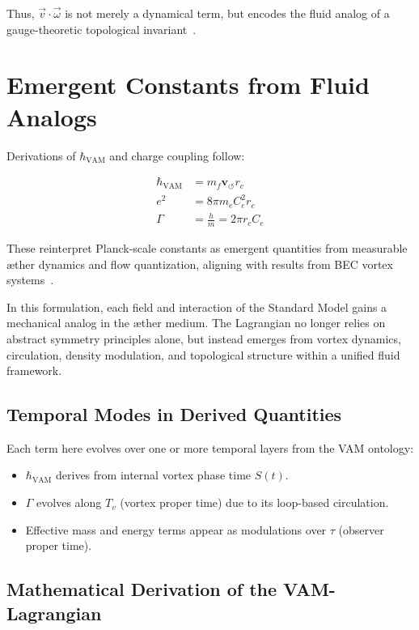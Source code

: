 \documentclass[12pt]{article}
\begin{document}
Thus, $\vec{v} \cdot \vec{\omega}$ is not merely a dynamical term, but encodes the fluid analog of a gauge-theoretic topological invariant~\cite{verlinde2021qft}.
\section{Emergent Constants from Fluid Analogs}
Derivations of $\hbar_{\text{VAM}}$ and charge coupling follow:

\begin{align}
    \hbar_{\text{VAM}} &= m_f \mathbf{v}_{\scriptscriptstyle\boldsymbol{\circlearrowleft}} r_c \\
    e^2 &= 8\pi m_e C_e^2 r_c \\
    \Gamma &= \frac{h}{m} = 2\pi r_c C_e
\end{align}

These reinterpret Planck-scale constants as emergent quantities from measurable \ae{}ther dynamics and flow quantization, aligning with results from BEC vortex systems~\cite{Pethick2008BEC, Donnelly1991QuantizedVortices}.

In this formulation, each field and interaction of the Standard Model gains a mechanical analog in the \ae{}ther medium. The Lagrangian no longer relies on abstract symmetry principles alone, but instead emerges from vortex dynamics, circulation, density modulation, and topological structure within a unified fluid framework.

\subsection{Temporal Modes in Derived Quantities}
Each term here evolves over one or more temporal layers from the VAM ontology:
\begin{itemize}
    \item $\hbar_{\text{VAM}}$ derives from internal vortex phase time $S(t)$.
    \item $\Gamma$ evolves along $T_v$ (vortex proper time) due to its loop-based circulation.
    \item Effective mass and energy terms appear as modulations over $\tau$ (observer proper time).
\end{itemize}

\subsection{Mathematical Derivation of the VAM-Lagrangian}
\end{document}
